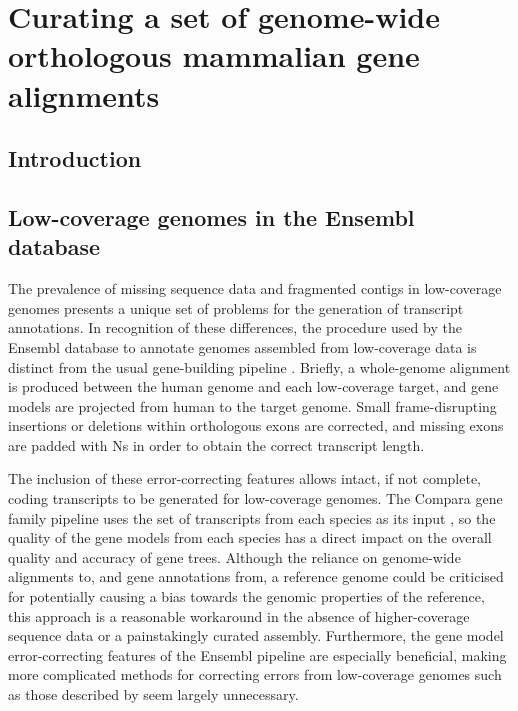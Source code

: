 \chapter{Curating a set of genome-wide orthologous mammalian gene alignments}
\label{ch_orthologs}

\section{Introduction}

\section{Low-coverage genomes in the Ensembl database}

The prevalence of missing sequence data and fragmented contigs in
low-coverage genomes presents a unique set of problems for the
generation of transcript annotations. In recognition of these
differences, the procedure used by the Ensembl database to annotate
genomes assembled from low-coverage data is distinct from the usual
gene-building pipeline \citep{Hubbard2007}. Briefly, a whole-genome
alignment is produced between the human genome and each low-coverage
target, and gene models are projected from human to the target
genome. Small frame-disrupting insertions or deletions within
orthologous exons are corrected, and missing exons are padded with Ns
in order to obtain the correct transcript length.

The inclusion of these error-correcting features allows intact, if not
complete, coding transcripts to be generated for low-coverage
genomes. The Compara gene family pipeline uses the set of transcripts
from each species as its input \citep{Vilella2009}, so the quality of
the gene models from each species has a direct impact on the overall
quality and accuracy of gene trees. Although the reliance on
genome-wide alignments to, and gene annotations from, a reference
genome could be criticised for potentially causing a bias towards the
genomic properties of the reference, this approach is a reasonable
workaround in the absence of higher-coverage sequence data or a
painstakingly curated assembly. Furthermore, the gene model
error-correcting features of the Ensembl pipeline are especially
beneficial, making more complicated methods for correcting errors from
low-coverage genomes such as those described by \citep{Hubisz2011}
seem largely unnecessary.


